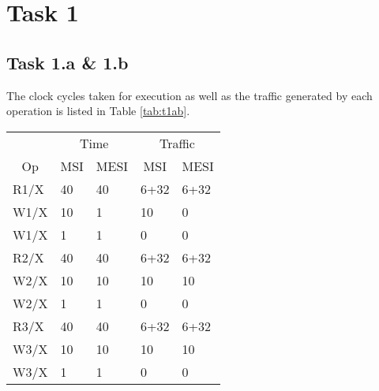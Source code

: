 \section{Task 1}
\subsection{Task 1.a \& 1.b}

The clock cycles taken for execution as well as the traffic generated by each
operation is listed in Table \ref{tab:t1ab}.

\begin{table}[h]
\centering
\begin{tabular}{l|ll|ll}
                        & \multicolumn{2}{c|}{Time}                           & \multicolumn{2}{c|}{Traffic}                       \\
\multicolumn{1}{c|}{Op} & \multicolumn{1}{c}{MSI} & \multicolumn{1}{c|}{MESI} & \multicolumn{1}{c}{MSI} & \multicolumn{1}{c}{MESI} \\ \hline
R1/X                    & 40                      & 40                        & 6+32                    & 6+32                     \\
W1/X                    & 10                      & 1                         & 10                      & 0                        \\
W1/X                    & 1                       & 1                         & 0                       & 0                        \\
R2/X                    & 40                      & 40                        & 6+32                    & 6+32                     \\
W2/X                    & 10                      & 10                        & 10                      & 10                       \\
W2/X                    & 1                       & 1                         & 0                       & 0                        \\
R3/X                    & 40                      & 40                        & 6+32                    & 6+32                     \\
W3/X                    & 10                      & 10                        & 10                      & 10                       \\
W3/X                    & 1                       & 1                         & 0                       & 0                        \\

\end{tabular}
\end{table}
